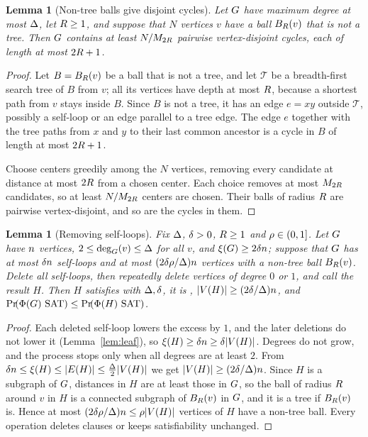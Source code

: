 \documentclass[11pt,a4paper]{article}
\newtheorem{lemma}[theorem]{Lemma}
\theoremstyle{definition}
\theoremstyle{remark}
\theoremstyle{plain}
\theoremstyle{definition}
\begin{document}
\begin{lemma}[Non-tree balls give disjoint cycles]\label{lem:nontree-cycles}
Let \(G\) have maximum degree at most \(\Delta\), let \(R\ge1\), and suppose
that \(N\) vertices \(v\) have a ball \(B_{R}(v)\) that is not a tree. Then \(G\)
contains at least \(N/M_{2R}\) pairwise vertex-disjoint cycles, each of length
at most \(2R+1\).
\end{lemma}

\begin{proof}
Let \(B=B_{R}(v)\) be a ball that is not a tree, and let \(\mathcal T\) be a
breadth-first search tree of \(B\) from \(v\); all its vertices have depth at
most \(R\), because a shortest path from \(v\) stays inside \(B\). Since \(B\)
is not a tree, it has an edge \(e=xy\) outside \(\mathcal T\), possibly a self-loop or
an edge parallel to a tree edge. The edge \(e\) together with the tree paths
from \(x\) and \(y\) to their last common ancestor is a cycle in \(B\) of
length at most \(2R+1\).

Choose centers greedily among the \(N\) vertices, removing every candidate at
distance at most \(2R\) from a chosen center. Each choice removes at most
\(M_{2R}\) candidates, so at least \(N/M_{2R}\) centers are chosen. Their balls
of radius \(R\) are pairwise vertex-disjoint, and so are the cycles in them.
\end{proof}

\begin{lemma}[Removing self-loops]\label{lem:remove-loops}
Fix \(\Delta\), \(\delta>0\), \(R\ge1\) and \(\rho\in(0,1]\). Let \(G\) have
\(n\) vertices, \(2\le\deg_{G}(v)\le\Delta\) for all \(v\), and
\(\xi(G)\ge2\delta n\); suppose that \(G\) has at most \(\delta n\)
self-loops and at most \((2\delta\rho/\Delta)n\) vertices with a non-tree
ball \(B_{R}(v)\). Delete all self-loops, then repeatedly delete vertices of
degree \(0\) or \(1\), and call the result \(H\). Then \(H\) satisfies \Hyp{}
with \(\Delta,\delta\), it is \loctree{\rad}{\nontree},
\(|V(H)|\ge(2\delta/\Delta)n\), and
\(\Prx{\rform{\Gin}\SAT}\le\Prx{\rform{H}\SAT}\).
\end{lemma}

\begin{proof}
Each deleted self-loop lowers the excess by \(1\), and the later deletions do
not lower it (Lemma~\ref{lem:leaf}), so
\(\xi(H)\ge\delta n\ge\delta|V(H)|\). Degrees do not grow, and the process
stops only when all degrees are at least \(2\). From
\(\delta n\le\xi(H)\le|E(H)|\le\frac{\Delta}2|V(H)|\) we get
\(|V(H)|\ge(2\delta/\Delta)n\). Since \(H\) is a subgraph of \(G\), distances
in \(H\) are at least those in \(G\), so the ball of radius \(R\) around \(v\)
in \(H\) is a connected subgraph of \(B_{R}(v)\) in \(G\), and it is a tree if
\(B_{R}(v)\) is. Hence at most \((2\delta\rho/\Delta)n\le\rho|V(H)|\) vertices
of \(H\) have a non-tree ball. Every operation deletes clauses or keeps
satisfiability unchanged.
\end{proof}
\end{document}
